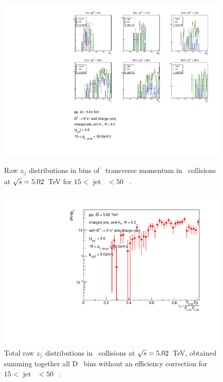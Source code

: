 \begin{figure}[bth]
\centering
\begin{minipage}{.65\textwidth}
  \centering
\includegraphics[width=\textwidth]{pp_2sig/R3_jetbin_15_50/jetRawSpectrum_pTD5}
\caption{Raw $z_{||}$ distributions in bins of \Dzero\ transverse momentum in \pp\ collisions at $\sqrt{s}=5.02$~TeV for $15<$ jet \pt\ $<50$ \GeVc\ .}
\label{fig:eq_pp_signBkgJet_Dzero_15_50_R3}
\end{minipage}%
\begin{minipage}{.4\textwidth}
  \centering
\includegraphics[width=\textwidth]{pp_2sig/R3_jetbin_15_50/jetPtSpectrum_SB_pTD5}
\caption{Total raw $z_{||}$ distributions in \pp\ collisions at $\sqrt{s}=5.02$~TeV, obtained summing together all D \pt\ bins without an efficiency correction for $15<$ jet \pt\ $<50$ \GeVc\ .
}
\label{fig:eq_pp_signBkgJet_tot_15_50_R3}
\end{minipage}
\end{figure}

